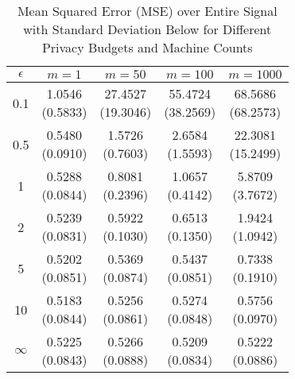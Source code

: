 \begin{table}[ht]
\centering
\begin{tabular}{ccccc}
  \toprule
$\epsilon$ & $m=1$ & $m=50$ & $m=100$ & $m=1000$ \\ 
  \midrule
0.1 & \makecell{1.0546 \\ (0.5833)} & \makecell{27.4527 \\ (19.3046)} & \makecell{55.4724 \\ (38.2569)} & \makecell{68.5686 \\ (68.2573)} \\ 
  0.5 & \makecell{0.5480 \\ (0.0910)} & \makecell{1.5726 \\ (0.7603)} & \makecell{2.6584 \\ (1.5593)} & \makecell{22.3081 \\ (15.2499)} \\ 
  1 & \makecell{0.5288 \\ (0.0844)} & \makecell{0.8081 \\ (0.2396)} & \makecell{1.0657 \\ (0.4142)} & \makecell{5.8709 \\ (3.7672)} \\ 
  2 & \makecell{0.5239 \\ (0.0831)} & \makecell{0.5922 \\ (0.1030)} & \makecell{0.6513 \\ (0.1350)} & \makecell{1.9424 \\ (1.0942)} \\ 
  5 & \makecell{0.5202 \\ (0.0851)} & \makecell{0.5369 \\ (0.0874)} & \makecell{0.5437 \\ (0.0851)} & \makecell{0.7338 \\ (0.1910)} \\ 
  10 & \makecell{0.5183 \\ (0.0844)} & \makecell{0.5256 \\ (0.0861)} & \makecell{0.5274 \\ (0.0848)} & \makecell{0.5756 \\ (0.0970)} \\ 
  $\infty$ & \makecell{0.5225 \\ (0.0843)} & \makecell{0.5266 \\ (0.0888)} & \makecell{0.5209 \\ (0.0834)} & \makecell{0.5222 \\ (0.0886)} \\ 
   \bottomrule
\end{tabular}
\caption{Mean Squared Error (MSE) over Entire Signal with Standard Deviation Below for Different Privacy Budgets and Machine Counts} 
\label{tab:mse_total}
\end{table}
